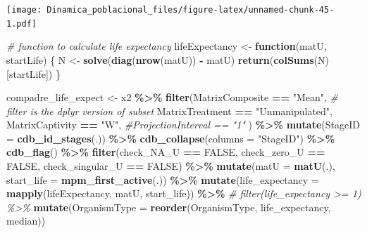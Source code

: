 \documentclass[
]{book}
\newenvironment{Shaded}{\begin{snugshade}}{\end{snugshade}}
\newcommand{\AttributeTok}[1]{\textcolor[rgb]{0.13,0.29,0.53}{#1}}
\newcommand{\CommentTok}[1]{\textcolor[rgb]{0.56,0.35,0.01}{\textit{#1}}}
\newcommand{\ConstantTok}[1]{\textcolor[rgb]{0.56,0.35,0.01}{#1}}
\newcommand{\ControlFlowTok}[1]{\textcolor[rgb]{0.13,0.29,0.53}{\textbf{#1}}}
\newcommand{\FunctionTok}[1]{\textcolor[rgb]{0.13,0.29,0.53}{\textbf{#1}}}
\newcommand{\NormalTok}[1]{#1}
\newcommand{\OtherTok}[1]{\textcolor[rgb]{0.56,0.35,0.01}{#1}}
\newcommand{\SpecialCharTok}[1]{\textcolor[rgb]{0.81,0.36,0.00}{\textbf{#1}}}
\newcommand{\StringTok}[1]{\textcolor[rgb]{0.31,0.60,0.02}{#1}}
\theoremstyle{definition}
\theoremstyle{definition}
\theoremstyle{definition}
\theoremstyle{definition}
\theoremstyle{remark}
\begin{document}
\texttt{[image: Dinamica\_poblacional\_files/figure-latex/unnamed-chunk-45-1.pdf]}

\begin{Shaded}
\begin{Highlighting}[]
\CommentTok{\# function to calculate life expectancy}
\NormalTok{lifeExpectancy }\OtherTok{\textless{}{-}} \ControlFlowTok{function}\NormalTok{(matU, startLife) \{}
\NormalTok{  N }\OtherTok{\textless{}{-}} \FunctionTok{solve}\NormalTok{(}\FunctionTok{diag}\NormalTok{(}\FunctionTok{nrow}\NormalTok{(matU)) }\SpecialCharTok{{-}}\NormalTok{ matU)}
  \FunctionTok{return}\NormalTok{(}\FunctionTok{colSums}\NormalTok{(N)[startLife])}
\NormalTok{\}}

\NormalTok{compadre\_life\_expect }\OtherTok{\textless{}{-}}\NormalTok{ x2 }\SpecialCharTok{\%\textgreater{}\%}
  \FunctionTok{filter}\NormalTok{(MatrixComposite }\SpecialCharTok{==} \StringTok{"Mean"}\NormalTok{, }\CommentTok{\# filter is the dplyr version of subset}
\NormalTok{         MatrixTreatment }\SpecialCharTok{==} \StringTok{"Unmanipulated"}\NormalTok{,}
\NormalTok{         MatrixCaptivity }\SpecialCharTok{==} \StringTok{"W"}\NormalTok{,}
         \CommentTok{\#ProjectionInterval == "1"}
\NormalTok{         ) }\SpecialCharTok{\%\textgreater{}\%} 
  \FunctionTok{mutate}\NormalTok{(}\AttributeTok{StageID =} \FunctionTok{cdb\_id\_stages}\NormalTok{(.)) }\SpecialCharTok{\%\textgreater{}\%}
  \FunctionTok{cdb\_collapse}\NormalTok{(}\AttributeTok{columns =} \StringTok{"StageID"}\NormalTok{) }\SpecialCharTok{\%\textgreater{}\%}
  \FunctionTok{cdb\_flag}\NormalTok{() }\SpecialCharTok{\%\textgreater{}\%} 
  \FunctionTok{filter}\NormalTok{(check\_NA\_U }\SpecialCharTok{==} \ConstantTok{FALSE}\NormalTok{,}
\NormalTok{         check\_zero\_U }\SpecialCharTok{==} \ConstantTok{FALSE}\NormalTok{,}
\NormalTok{         check\_singular\_U }\SpecialCharTok{==} \ConstantTok{FALSE}\NormalTok{) }\SpecialCharTok{\%\textgreater{}\%} 
  \FunctionTok{mutate}\NormalTok{(}\AttributeTok{matU =} \FunctionTok{matU}\NormalTok{(.), }\AttributeTok{start\_life =} \FunctionTok{mpm\_first\_active}\NormalTok{(.)) }\SpecialCharTok{\%\textgreater{}\%} 
  \FunctionTok{mutate}\NormalTok{(}\AttributeTok{life\_expectancy =} \FunctionTok{mapply}\NormalTok{(lifeExpectancy, matU, start\_life)) }\SpecialCharTok{\%\textgreater{}\%} 
 \CommentTok{\# filter(life\_expectancy \textgreater{}= 1) \%\textgreater{}\% }
  \FunctionTok{mutate}\NormalTok{(}\AttributeTok{OrganismType =} \FunctionTok{reorder}\NormalTok{(OrganismType, life\_expectancy, median))}
\end{Highlighting}
\end{Shaded}
\end{document}
